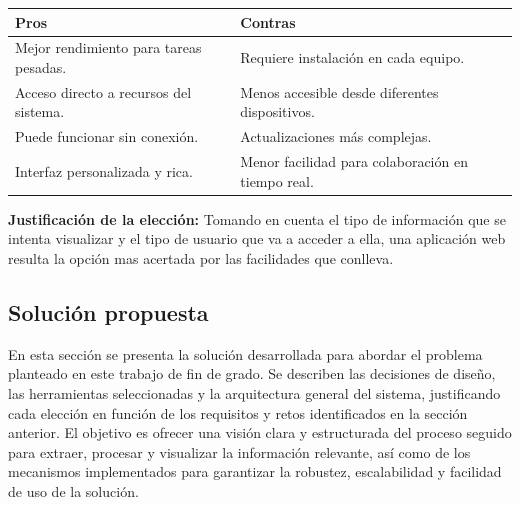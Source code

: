 \documentclass{article}
\begin{document}
\begin{enumerate}
\begin{enumerate}[label=\arabic*.]
    \begin{tabular}{p{6.5cm} p{6.5cm}}
    \hline
    \textbf{Pros} & \textbf{Contras} \\
    \hline
    Mejor rendimiento para tareas pesadas. & Requiere instalación en cada equipo. \\
    Acceso directo a recursos del sistema. & Menos accesible desde diferentes dispositivos. \\
    Puede funcionar sin conexión. & Actualizaciones más complejas. \\
    Interfaz personalizada y rica. & Menor facilidad para colaboración en tiempo real. \\
    \hline
    \end{tabular}
    \end{enumerate}
    \end{enumerate}

    \textbf{Justificación de la elección:} \newline
    Tomando en cuenta el tipo de información que se intenta visualizar y el tipo de usuario que va a acceder a ella, una aplicación web resulta la opción mas acertada por las facilidades que conlleva. 
    
\subsection{Solución propuesta}
En esta sección se presenta la solución desarrollada para abordar el problema planteado en este trabajo de fin de grado. Se describen las decisiones de diseño, las herramientas seleccionadas y la arquitectura general del sistema, justificando cada elección en función de los requisitos y retos identificados en la sección anterior. El objetivo es ofrecer una visión clara y estructurada del proceso seguido para extraer, procesar y visualizar la información relevante, así como de los mecanismos implementados para garantizar la robustez, escalabilidad y facilidad de uso de la solución.
\end{document}
